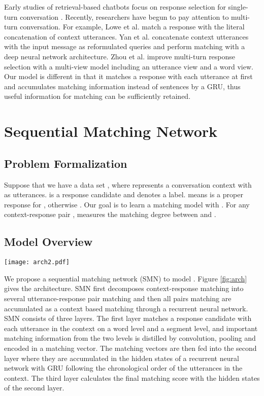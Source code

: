 \documentclass[11pt,a4paper]{article}
\begin{document}
	Early studies of retrieval-based chatbots focus on response selection for single-turn conversation \cite{wang2013dataset,ji2014information,wang2015syntax,DBLP:journals/corr/WuWLZ16}.
	Recently, researchers have begun to pay attention to multi-turn conversation. For example, Lowe et al.  match a response with the literal concatenation of context utterances. Yan et al.  concatenate context utterances with the input message as reformulated queries and perform matching with a deep neural network architecture. Zhou et al.  improve multi-turn response selection with a multi-view model including an utterance view and a word view. Our model is different in that it matches a response with each utterance at first and accumulates matching information instead of sentences by a GRU, thus useful information for matching can be sufficiently retained. 
	
	
	\section{Sequential Matching Network}
\subsection{Problem Formalization}\label{probform}
	Suppose that we have a data set , where  represents a conversation context with  as utterances.   is a response candidate and  denotes a label.  means  is a proper response for , otherwise .  Our goal is to learn a matching model  with . For any context-response pair ,  measures the matching degree between  and . 
	
	\subsection{Model Overview}
	\begin{figure*}[t]	
		\begin{center}
			\texttt{[image: arch2.pdf]}	
		\end{center}
		\vspace{-3mm}
		\caption{Architecture of SMN}\label{fig:arch}\vspace{-3mm}
	\end{figure*}
	We propose a sequential matching network (SMN) to model . Figure \ref{fig:arch} gives the architecture. SMN first decomposes context-response matching into several utterance-response pair matching and then all pairs matching are accumulated as a context based matching through a recurrent neural network. SMN consists of three layers. The first layer matches a response candidate with each utterance in the context on a word level and a segment level, and important matching information from the two levels is distilled by convolution, pooling and encoded in a matching vector. The matching vectors are then fed into the second layer where they are accumulated in the hidden states of a recurrent neural network with GRU following the chronological order of the utterances in the context. The third layer calculates the final matching score with the hidden states of the second layer.
	
\end{document}
